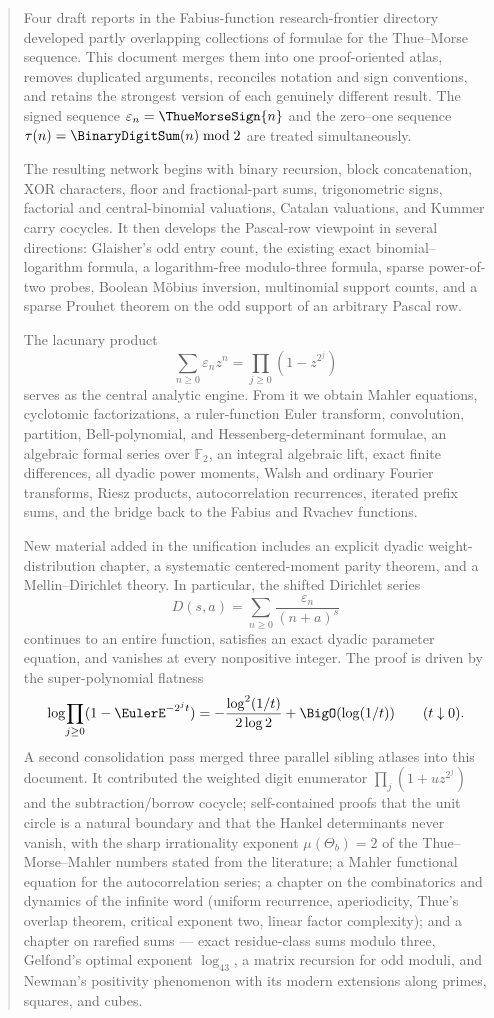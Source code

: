 \documentclass[11pt,oneside]{article}
\numberwithin{equation}{section}
\theoremstyle{definition}
\theoremstyle{remark}
\newcommand{\eps}{\varepsilon}
\begin{document}
\begin{abstract}
Four draft reports in the Fabius-function research-frontier directory developed
partly overlapping collections of formulae for the Thue--Morse sequence.  This
document merges them into one proof-oriented atlas, removes duplicated
arguments, reconciles notation and sign conventions, and retains the strongest
version of each genuinely different result.  The signed sequence
\(\eps_n=\ThueMorseSign{n}\) and the zero--one sequence
\(\tau(n)=\BinaryDigitSum(n)\bmod2\) are treated simultaneously.

The resulting network begins with binary recursion, block concatenation, XOR
characters, floor and fractional-part sums, trigonometric signs, factorial and
central-binomial valuations, Catalan valuations, and Kummer carry cocycles.  It
then develops the Pascal-row viewpoint in several directions: Glaisher's odd
entry count, the existing exact binomial--logarithm formula, a logarithm-free
modulo-three formula, sparse power-of-two probes, Boolean M\"obius inversion,
multinomial support counts, and a sparse Prouhet theorem on the odd support of
an arbitrary Pascal row.

The lacunary product
\[
  \sum_{n\ge0}\eps_nz^n=\prod_{j\ge0}(1-z^{2^j})
\]
serves as the central analytic engine.  From it we obtain Mahler equations,
cyclotomic factorizations, a ruler-function Euler transform, convolution,
partition, Bell-polynomial, and Hessenberg-determinant formulae, an algebraic
formal series over \(\mathbb F_2\), an integral algebraic lift, exact finite
differences, all dyadic power moments, Walsh and ordinary Fourier transforms,
Riesz products, autocorrelation recurrences, iterated prefix sums, and the
bridge back to the Fabius and Rvachev functions.

New material added in the unification includes an explicit dyadic
weight-distribution chapter, a systematic centered-moment parity theorem, and a
Mellin--Dirichlet theory.  In particular, the shifted Dirichlet series
\[
  D(s,a)=\sum_{n\ge0}\frac{\eps_n}{(n+a)^s}
\]
continues to an entire function, satisfies an exact dyadic parameter equation,
and vanishes at every nonpositive integer.  The proof is driven by the
super-polynomial flatness
\[
 \log\!\prod_{j\ge0}(1-\EulerE^{-2^jt})
 =-\frac{\log^2(1/t)}{2\log2}+\BigO(\log(1/t))
 \qquad(t\downarrow0).
\]
A second consolidation pass merged three parallel sibling atlases into this
document.  It contributed the weighted digit enumerator
\(\prod_j(1+uz^{2^j})\) and the subtraction/borrow cocycle; self-contained
proofs that the unit circle is a natural boundary and that the Hankel
determinants never vanish, with the sharp irrationality exponent
\(\mu(\Theta_b)=2\) of the Thue--Morse--Mahler numbers stated from the
literature; a Mahler functional equation for the autocorrelation series; a
chapter on the combinatorics and dynamics of the infinite word (uniform
recurrence, aperiodicity, Thue's overlap theorem, critical exponent two,
linear factor complexity); and a chapter on rarefied sums --- exact
residue-class sums modulo three, Gelfond's optimal exponent
\(\log_43\), a matrix recursion for odd moduli, and Newman's positivity
phenomenon with its modern extensions along primes, squares, and cubes.


\end{abstract}
\end{document}
